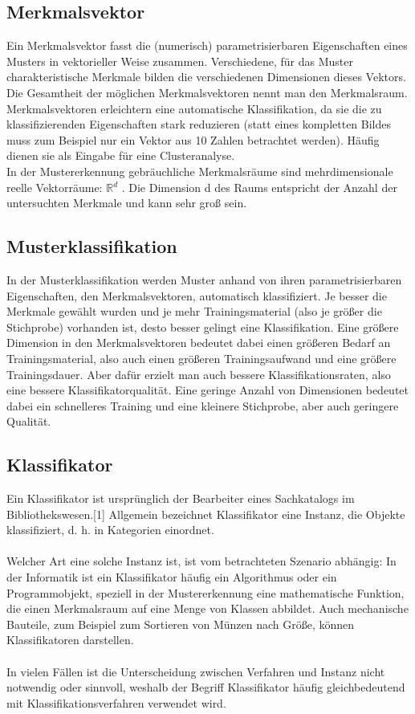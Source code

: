 \subsection{Merkmalsvektor}
Ein Merkmalsvektor fasst die (numerisch) parametrisierbaren Eigenschaften eines Musters in vektorieller Weise zusammen. Verschiedene, für das Muster charakteristische Merkmale bilden die verschiedenen Dimensionen dieses Vektors. Die Gesamtheit der möglichen Merkmalsvektoren nennt man den Merkmalsraum. Merkmalsvektoren erleichtern eine automatische Klassifikation, da sie die zu klassifizierenden Eigenschaften stark reduzieren (statt eines kompletten Bildes muss zum Beispiel nur ein Vektor aus 10 Zahlen betrachtet werden). Häufig dienen sie als Eingabe für eine Clusteranalyse.\\
In der Mustererkennung gebräuchliche Merkmalsräume sind mehrdimensionale reelle Vektorräume: ${\mathbb{R}{^d}}$ .
Die Dimension d des Raums entspricht der Anzahl der untersuchten Merkmale und kann sehr groß sein.

\subsection{Musterklassifikation}
In der Musterklassifikation werden Muster anhand von ihren parametrisierbaren Eigenschaften, den Merkmalsvektoren, automatisch klassifiziert. Je besser die Merkmale gewählt wurden und je mehr Trainingsmaterial (also je größer die Stichprobe) vorhanden ist, desto besser gelingt eine Klassifikation. Eine größere Dimension in den Merkmalsvektoren bedeutet dabei einen größeren Bedarf an Trainingsmaterial, also auch einen größeren Trainingsaufwand und eine größere Trainingsdauer. Aber dafür erzielt man auch bessere Klassifikationsraten, also eine bessere Klassifikatorqualität. Eine geringe Anzahl von Dimensionen bedeutet dabei ein schnelleres Training und eine kleinere Stichprobe, aber auch geringere Qualität.

\subsection{Klassifikator}
Ein Klassifikator ist ursprünglich der Bearbeiter eines Sachkatalogs im Bibliothekswesen.[1] Allgemein bezeichnet Klassifikator eine Instanz, die Objekte klassifiziert, d. h. in Kategorien einordnet.\\
\\
Welcher Art eine solche Instanz ist, ist vom betrachteten Szenario abhängig: In der Informatik ist ein Klassifikator häufig ein Algorithmus oder ein Programmobjekt, speziell in der Mustererkennung eine mathematische Funktion, die einen Merkmalsraum auf eine Menge von Klassen abbildet. Auch mechanische Bauteile, zum Beispiel zum Sortieren von Münzen nach Größe, können Klassifikatoren darstellen.\\
\\
In vielen Fällen ist die Unterscheidung zwischen Verfahren und Instanz nicht notwendig oder sinnvoll, weshalb der Begriff Klassifikator häufig gleichbedeutend mit Klassifikationsverfahren verwendet wird.

